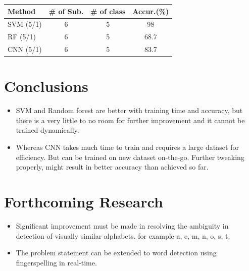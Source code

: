 \documentclass[a0,landscape]{a0poster}
\begin{document}
\begin{multicols}{4}
\begin{center}\vspace{1cm}

\label{my-label}
\begin{tabular}{@{}lccc@{}}
\toprule
Method & \multicolumn{1}{l}{\textbf{\# of Sub.}} & \multicolumn{1}{l}{\textbf{\# of class}} & \multicolumn{1}{l}{\textbf{Accur.(\%)}} \\ \midrule
\multicolumn{1}{|l|}{SVM (5/1)} & \multicolumn{1}{c|}{6} & \multicolumn{1}{c|}{5} & \multicolumn{1}{c|}{98} \\ \midrule
RF (5/1) & 6 & 5 & 68.7 \\ \midrule
\multicolumn{1}{|l|}{CNN (5/1)} & \multicolumn{1}{c|}{6} & \multicolumn{1}{c|}{5} & \multicolumn{1}{c|}{83.7} \\ \bottomrule
\end{tabular}
\end{center}


\color{SaddleBrown} %

\section*{Conclusions}

\begin{itemize}
\item SVM and Random forest are better with training time and accuracy, but there is a very little to no room for further improvement and it cannot be trained dynamically.  
\item Whereas CNN takes much time to train and requires a large dataset for efficiency. But can be trained on new dataset on-the-go. Further tweaking properly, might result in better accuracy than achieved so far. 
\end{itemize}

\color{DarkSlateGray} %


\section*{Forthcoming Research}
\begin{itemize}
\item Significant improvement must be made in resolving the ambiguity in detection of visually similar alphabets. for example {a, e, m, n, o, s, t}.
\item The problem statement can be extended to word detection using fingerspelling in real-time.
\end{itemize}


\end{multicols}
\end{document}
